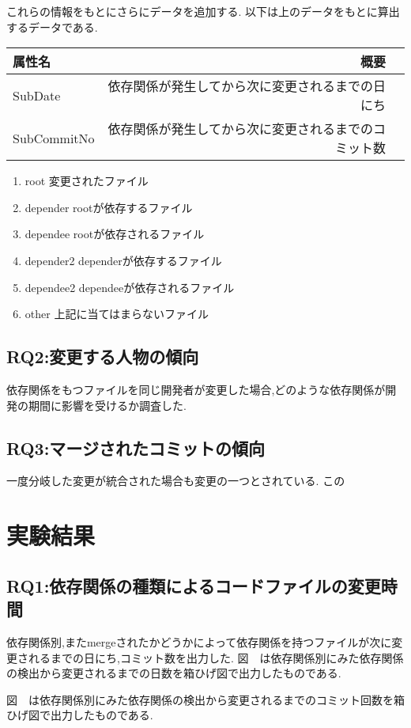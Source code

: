 \documentclass{jsarticle}
\begin{document}
これらの情報をもとにさらにデータを追加する.
以下は上のデータをもとに算出するデータである.
\begin{tabular}{|l|r|r|} \hline
属性名 & 概要 \\ \hline
SubDate & 依存関係が発生してから次に変更されるまでの日にち \\ \hline
SubCommitNo & 依存関係が発生してから次に変更されるまでのコミット数 \\ \hline
\end{tabular}

\begin{enumerate}
\item root 変更されたファイル
\item depender rootが依存するファイル
\item dependee rootが依存されるファイル
\item depender2 dependerが依存するファイル
\item dependee2 dependeeが依存されるファイル
\item other 上記に当てはまらないファイル
\end{enumerate}

\subsection{RQ2:変更する人物の傾向}
依存関係をもつファイルを同じ開発者が変更した場合,どのような依存関係が開発の期間に影響を受けるか調査した.


\subsection{RQ3:マージされたコミットの傾向}
一度分岐した変更が統合された場合も変更の一つとされている.
この



\section{実験結果}
\subsection{RQ1:依存関係の種類によるコードファイルの変更時間}
依存関係別,またmergeされたかどうかによって依存関係を持つファイルが次に変更されるまでの日にち,コミット数を出力した.
図　は依存関係別にみた依存関係の検出から変更されるまでの日数を箱ひげ図で出力したものである.　　

図　は依存関係別にみた依存関係の検出から変更されるまでのコミット回数を箱ひげ図で出力したものである.
\end{document}
